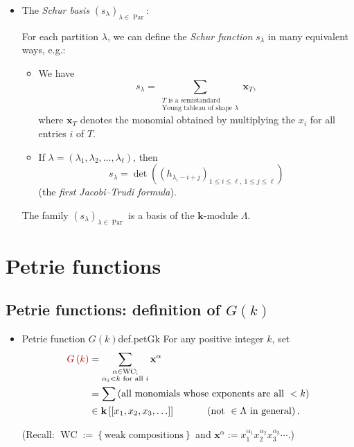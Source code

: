 \documentclass[numbers=enddot,12pt,final,onecolumn,notitlepage]{scrartcl}%
\newcommand{\defn}[1]{{\color{darkred}\emph{#1}}}
\newcommand{\defnm}[1]{{\color{darkred} #1}}
\newcommand{\0}{\phantom{c}}
\let\sumnonlimits\sum
\renewcommand{\sum}{\sumnonlimits\limits}
\newcommand{\nowbox}{\hphantom{x} \vspace{-1.5pc}}
\begin{document}
\begin{itemize}
\item The \defn{Schur basis }$\left(  s_{\lambda}\right)  _{\lambda
\in\operatorname*{Par}}$:

For each partition $\lambda$, we can define the \defn{Schur function}
$s_{\lambda}$ in many equivalent ways, e.g.:

\begin{itemize}
\item We have%
\[
s_{\lambda}=\sum_{\substack{T\text{ is a semistandard}\\\text{Young tableau of
shape }\lambda}}\mathbf{x}_{T},
\]
where $\mathbf{x}_{T}$ denotes the monomial obtained by multiplying the
$x_{i}$ for all entries $i$ of $T$.

\item If $\lambda=\left(  \lambda_{1},\lambda_{2},\ldots,\lambda_{\ell
}\right)  $, then%
\[
s_{\lambda}=\det\left(  \left(  h_{\lambda_{i}-i+j}\right)  _{1\leq i\leq
\ell,\ 1\leq j\leq\ell}\right)
\]
(the \defn{first Jacobi--Trudi formula}).
\end{itemize}

The family $\left(  s_{\lambda}\right)  _{\lambda\in\operatorname*{Par}}$ is a
basis of the $\mathbf{k}$-module $\Lambda$.
\end{itemize}

\section{Petrie functions}

\subsection{Petrie functions: definition of $G(k)$}

\begin{itemize}
\item \nowbox
\begin{definition}{Petrie function $G(k)$}{def.petGk}
For any positive integer $k$, set%
\begin{align*}
\defnm{G\left( k\right)}  &  =\sum_{\substack{\alpha\in\operatorname*{WC}%
;\\\alpha_{i}<k\text{ for all }i}}\mathbf{x}^{\alpha}\\
&  =\sum\left(  \text{all monomials whose exponents are all }<k\right) \\
&  \in\mathbf{k}\left[  \left[  x_{1},x_{2},x_{3},\ldots\right]  \right]
\ \ \ \ \ \ \ \ \ \ \left(  \text{not }\in\Lambda\text{ in general}\right)  .
\end{align*}
\end{definition}

(Recall:
$\operatorname{WC} := \left\{\text{weak compositions}\right\}$
and $\mathbf{x}^\alpha := x_1^{\alpha_1} x_2^{\alpha_2} x_3^{\alpha_3} \cdots$.)

\end{itemize}
\end{document}
